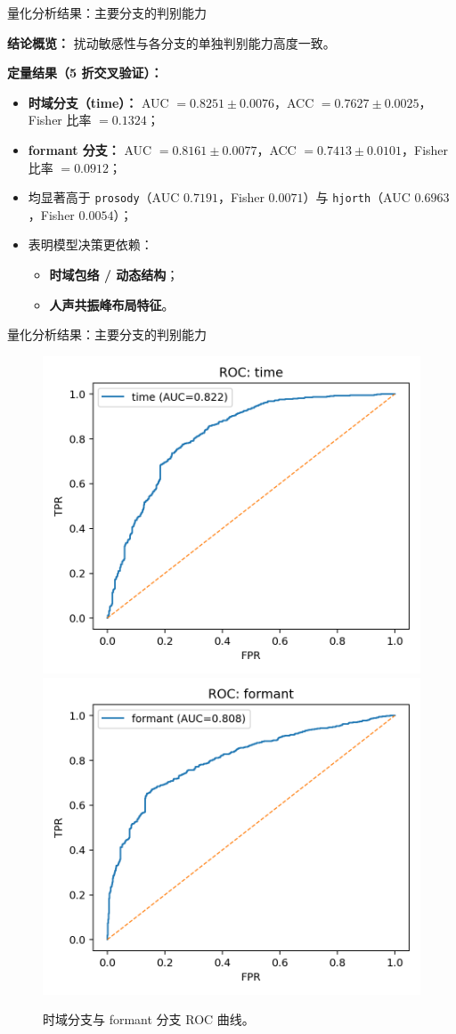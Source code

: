 \documentclass[aspectratio=169]{beamer}
\begin{document}
\begin{frame}{量化分析结果：主要分支的判别能力}

\textbf{结论概览：}
扰动敏感性与各分支的单独判别能力高度一致。

\textbf{定量结果（5 折交叉验证）：}
\begin{itemize}
  \item \textbf{时域分支（time）：}  
    AUC $=0.8251\!\pm\!0.0076$，ACC $=0.7627\!\pm\!0.0025$，Fisher 比率 $=0.1324$；
  \item \textbf{formant 分支：}  
    AUC $=0.8161\!\pm\!0.0077$，ACC $=0.7413\!\pm\!0.0101$，Fisher 比率 $=0.0912$；
  \item 均显著高于 \texttt{prosody}（AUC $0.7191$，Fisher $0.0071$）与  
        \texttt{hjorth}（AUC $0.6963$，Fisher $0.0054$）；
  \item 表明模型决策更依赖：
    \begin{itemize}
      \item \textbf{时域包络 / 动态结构}；
      \item \textbf{人声共振峰布局特征}。
    \end{itemize}
\end{itemize}

\end{frame}

\begin{frame}{量化分析结果：主要分支的判别能力}
\begin{figure}
  \centering
  \includegraphics[width=0.45\linewidth]{images_in_paper/roc_time.png}
  \hfill
  \includegraphics[width=0.45\linewidth]{images_in_paper/roc_formant.png}
  \caption{时域分支与 formant 分支 ROC 曲线。}
  \label{fig:roc}
\end{figure}

\end{frame}
\end{document}

